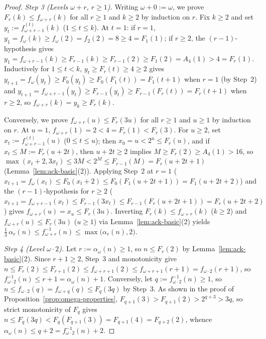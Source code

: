 \documentclass[11pt]{article}
\theoremstyle{definition}
\theoremstyle{remark}
\begin{document}
\begin{proof}
\emph{Step 3 (Levels $\omega + r$, $r \ge 1$).} Writing $\omega + 0 := \omega$, we prove $F_r(k) \le f_{\omega + r}(k)$ for all $r \ge 1$ and $k \ge 2$ by induction on $r$. Fix $k \ge 2$ and set $y_t := f_{\omega + r - 1}^{(t)}(k)$ ($1 \le t \le k$). At $t = 1$: if $r = 1$, $y_1 = f_\omega(k) \ge f_\omega(2) = f_2(2) = 8 \ge 4 = F_1(1)$; if $r \ge 2$, the $(r - 1)$-hypothesis gives $y_1 = f_{\omega + r - 1}(k) \ge F_{r-1}(k) \ge F_{r-1}(2) \ge F_1(2) = A_4(1) > 4 = F_r(1)$. Inductively for $1 \le t < k$, $y_t \ge F_r(t) \ge 4 \ge 2$ gives $y_{t+1} = f_\omega(y_t) \ge F_0(y_t) \ge F_0(F_1(t)) = F_1(t + 1)$ when $r = 1$ (by Step~2) and $y_{t+1} = f_{\omega + r - 1}(y_t) \ge F_{r-1}(y_t) \ge F_{r-1}(F_r(t)) = F_r(t + 1)$ when $r \ge 2$, so $f_{\omega + r}(k) = y_k \ge F_r(k)$.

Conversely, we prove $f_{\omega + r}(u) \le F_r(3u)$ for all $r \ge 1$ and $u \ge 1$ by induction on $r$. At $u = 1$, $f_{\omega + r}(1) = 2 < 4 = F_r(1) < F_r(3)$. For $u \ge 2$, set $x_t := f_{\omega + r - 1}^{(t)}(u)$ ($0 \le t \le u$); then $x_0 = u < 2^u \le F_r(u)$, and if $x_t \le M := F_r(u + 2t)$, then $u + 2t \ge 2$ implies $M \ge F_r(2) \ge A_4(1) > 16$, so $\max(x_t + 2, 3 x_t) \le 3M < 2^M \le F_{r-1}(M) = F_r(u + 2t + 1)$ (Lemma~\ref{lem:ack-basic}(2)). Applying Step~2 at $r = 1$ ($x_{t+1} = f_\omega(x_t) \le F_0(x_t + 2) \le F_0(F_1(u + 2t + 1)) = F_1(u + 2t + 2)$) and the $(r - 1)$-hypothesis for $r \ge 2$ ($x_{t+1} = f_{\omega + r - 1}(x_t) \le F_{r-1}(3 x_t) \le F_{r-1}(F_r(u + 2t + 1)) = F_r(u + 2t + 2)$) gives $f_{\omega + r}(u) = x_u \le F_r(3u)$. Inverting $F_r(k) \le f_{\omega + r}(k)$ ($k \ge 2$) and $f_{\omega + r}(u) \le F_r(3u)$ ($u \ge 1$) via Lemma~\ref{lem:ack-basic}(2) yields $\frac{1}{3}\,\alpha_r(n) \le f_{\omega + r}^{-1}(n) \le \max\big(\alpha_r(n), 2\big)$.

\emph{Step 4 (Level $\omega \cdot 2$).} Let $r := \alpha_\omega(n) \ge 1$, so $n \le F_r(2)$ by Lemma~\ref{lem:ack-basic}(2). Since $r + 1 \ge 2$, Step~3 and monotonicity give $n \le F_r(2) \le F_{r+1}(2) \le f_{\omega + r + 1}(2) \le f_{\omega + r + 1}(r + 1) = f_{\omega \cdot 2}(r + 1)$, so $f_{\omega \cdot 2}^{-1}(n) \le r + 1 = \alpha_\omega(n) + 1$. Conversely, let $q := f_{\omega \cdot 2}^{-1}(n) \ge 1$, so $n \le f_{\omega \cdot 2}(q) = f_{\omega + q}(q) \le F_q(3q)$ by Step~3. As shown in the proof of Proposition~\ref{prop:omega-properties}, $F_{q+1}(3) > F_{q+1}(2) > 2^{q+3} > 3q$, so strict monotonicity of $F_q$ gives $n \le F_q(3q) < F_q(F_{q+1}(3)) = F_{q+1}(4) = F_{q+2}(2)$, whence $\alpha_\omega(n) \le q + 2 = f_{\omega \cdot 2}^{-1}(n) + 2$.
\end{proof}
\end{document}
